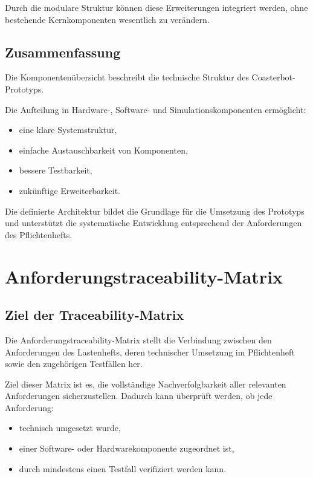 Durch die modulare Struktur können diese Erweiterungen integriert
werden, ohne bestehende Kernkomponenten wesentlich zu verändern.

\subsection{Zusammenfassung}\label{zusammenfassung-6}

Die Komponentenübersicht beschreibt die technische Struktur des
Coasterbot-Prototyps.

Die Aufteilung in Hardware-, Software- und Simulationskomponenten
ermöglicht:

\begin{itemize}
\tightlist
\item
  eine klare Systemstruktur,
\item
  einfache Austauschbarkeit von Komponenten,
\item
  bessere Testbarkeit,
\item
  zukünftige Erweiterbarkeit.
\end{itemize}

Die definierte Architektur bildet die Grundlage für die Umsetzung des
Prototyps und unterstützt die systematische Entwicklung entsprechend der
Anforderungen des Pflichtenhefts.

\section{Anforderungstraceability-Matrix}\label{anforderungstraceability-matrix}

\subsection{Ziel der
Traceability-Matrix}\label{ziel-der-traceability-matrix}

Die Anforderungstraceability-Matrix stellt die Verbindung zwischen den
Anforderungen des Lastenhefts, deren technischer Umsetzung im
Pflichtenheft sowie den zugehörigen Testfällen her.

Ziel dieser Matrix ist es, die vollständige Nachverfolgbarkeit aller
relevanten Anforderungen sicherzustellen. Dadurch kann überprüft werden,
ob jede Anforderung:

\begin{itemize}
\tightlist
\item
  technisch umgesetzt wurde,
\item
  einer Software- oder Hardwarekomponente zugeordnet ist,
\item
  durch mindestens einen Testfall verifiziert werden kann.
\end{itemize}

